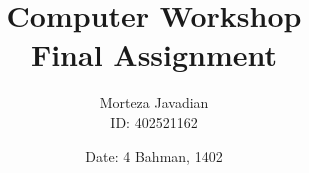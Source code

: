 \documentclass[titlepage]{article}
\title{\huge Computer Workshop\\Final Assignment}
\author{Morteza Javadian\\ID: 402521162}
\date{Date: 4 Bahman, 1402}
\begin{document}
	
	\maketitle
	
	\renewcommand{\contentsname }{ TABLE OF CONTENTS}
	
	\tableofcontents
	\let\LaTeXStandardTableOfContents\tableofcontents
	
	\renewcommand{\tableofcontents}
	{
		\begingroup
		\renewcommand{\bfseries}{\relax}
		\LaTeXStandardTableOfContents
		\endgroup
	}
	
	
\end{document}
